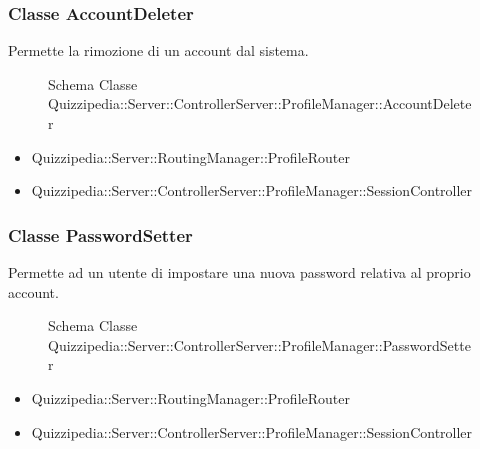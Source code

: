 \subsubsection{Classe AccountDeleter}
Permette la rimozione di un account dal sistema.
\begin{figure}[H]
\centering
\noindent{}
\caption[Schema Classe AccountDeleter]{Schema Classe Quizzipedia::Server::ControllerServer::ProfileManager::AccountDeleter}
\end{figure}
\begin{itemize}
\item Quizzipedia::Server::RoutingManager::ProfileRouter
\end{itemize}
\begin{itemize}
\item Quizzipedia::Server::ControllerServer::ProfileManager::SessionController
\end{itemize}
\subsubsection{Classe PasswordSetter}
Permette ad un utente di impostare una nuova password relativa al proprio account.
\begin{figure}[H]
\centering
\noindent{}
\caption[Schema Classe PasswordSetter]{Schema Classe Quizzipedia::Server::ControllerServer::ProfileManager::PasswordSetter}
\end{figure}
\begin{itemize}
\item Quizzipedia::Server::RoutingManager::ProfileRouter
\end{itemize}
\begin{itemize}
\item Quizzipedia::Server::ControllerServer::ProfileManager::SessionController
\end{itemize}
